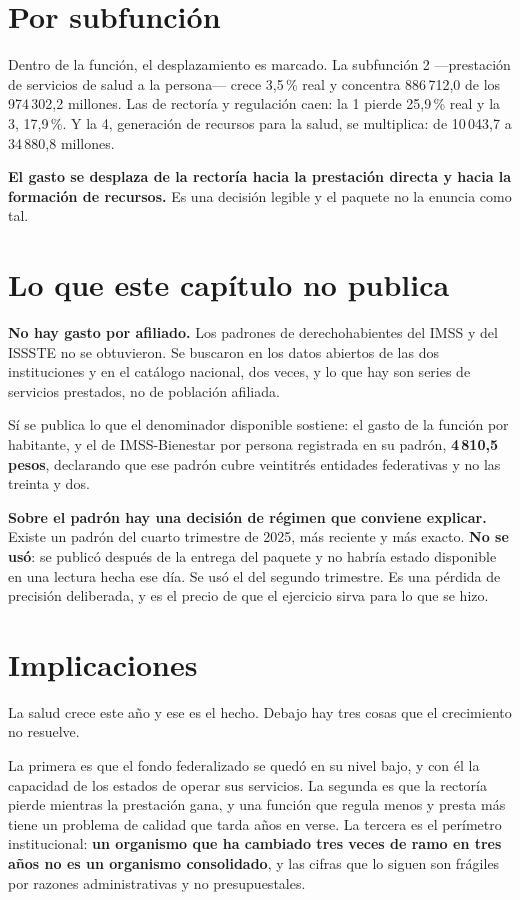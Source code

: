 \section{Por subfunción}

Dentro de la función, el desplazamiento es marcado. La subfunción 2 ---prestación de servicios
de salud a la persona--- crece 3,5\,\% real y concentra 886\,712,0 de los 974\,302,2 millones.
Las de rectoría y regulación caen: la 1 pierde 25,9\,\% real y la 3, 17,9\,\%. Y la 4, generación
de recursos para la salud, se multiplica: de 10\,043,7 a 34\,880,8 millones.

\textbf{El gasto se desplaza de la rectoría hacia la prestación directa y hacia la formación de
recursos.} Es una decisión legible y el paquete no la enuncia como tal.

\section{Lo que este capítulo no publica}

\textbf{No hay gasto por afiliado.} Los padrones de derechohabientes del IMSS y del ISSSTE no
se obtuvieron. Se buscaron en los datos abiertos de las dos instituciones y en el catálogo
nacional, dos veces, y lo que hay son series de servicios prestados, no de población
afiliada.

Sí se publica lo que el denominador disponible sostiene: el gasto de la función por habitante,
y el de IMSS-Bienestar por persona registrada en su padrón, \textbf{4\,810,5 pesos},
declarando que ese padrón cubre veintitrés entidades federativas y no las treinta y dos.

\textbf{Sobre el padrón hay una decisión de régimen que conviene explicar.} Existe un padrón
del cuarto trimestre de 2025, más reciente y más exacto. \textbf{No se usó}: se publicó
después de la entrega del paquete y no habría estado disponible en una lectura hecha ese día.
Se usó el del segundo trimestre. Es una pérdida de precisión deliberada, y es el precio de que
el ejercicio sirva para lo que se hizo.

\section{Implicaciones}

La salud crece este año y ese es el hecho. Debajo hay tres cosas que el crecimiento no
resuelve.

La primera es que el fondo federalizado se quedó en su nivel bajo, y con él la capacidad de
los estados de operar sus servicios. La segunda es que la rectoría pierde mientras la
prestación gana, y una función que regula menos y presta más tiene un problema de calidad que
tarda años en verse. La tercera es el perímetro institucional: \textbf{un organismo que ha
cambiado tres veces de ramo en tres años no es un organismo consolidado}, y las cifras que lo
siguen son frágiles por razones administrativas y no presupuestales.

